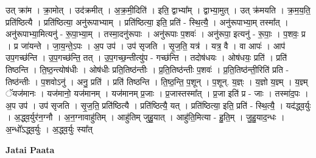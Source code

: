 \documentclass[17pt]{extarticle}
\begin{document}
उत् क्रा॑म । क्रा॒मोत् । उद॑क्रमीत् । अ॒क्र॒मी॒दिति॑ । इति॒ द्वाभ्या᳚म् । द्वाभ्या॒मुत् । उत् क्र॑मयति । क्र॒म॒य॒ति॒ प्रति॑ष्ठित्यै । प्रति॑ष्ठित्या॒ अनु॑रूपाभ्याम् । प्रति॑ष्ठित्या॒ इति॒ प्रति॑ - स्थि॒त्यै॒ । अनु॑रूपाभ्या॒म् तस्मा᳚त् । अनु॑रूपाभ्या॒मित्यनु॑ - रू॒पा॒भ्या॒म् । तस्मा॒दनु॑रूपाः । अनु॑रूपाः प॒शवः॑ । अनु॑रूपा॒ इत्यनु॑ - रू॒पाः॒ । प॒शवः॒ प्र । प्र जा॑यन्ते । जा॒य॒न्ते॒ऽपः । अ॒प उप॑ । उप॑ सृजति । सृ॒ज॒ति॒ यत्र॑ । यत्र॒ वै । वा आपः॑ । आप॑ उप॒गच्छ॑न्ति । उ॒प॒गच्छ॑न्ति॒ तत् । उ॒प॒गच्छ॒न्तीत्यु॑प - गच्छ॑न्ति । तदोष॑धयः । ओष॑धयः॒ प्रति॑ । प्रति॑ तिष्ठन्ति । ति॒ष्ठ॒न्त्योष॑धीः । ओष॑धीः प्रति॒तिष्ठ॑न्तीः । प्र॒ति॒तिष्ठ॑न्तीः प॒शवः॑ । प्र॒ति॒तिष्ठ॑न्ती॒रिति॑ प्रति - तिष्ठ॑न्तीः । प॒शवोऽनु॑ । अनु॒ प्रति॑ । प्रति॑ तिष्ठन्ति । ति॒ष्ठ॒न्ति॒ प॒शून् । प॒शून्. य॒ज्ञ्ः । य॒ज्ञो य॒ज्ञ्म् । य॒ज्ञ्म् ॅयज॑मानः । यज॑मानो॒ यज॑मानम् । यज॑मानम् प्र॒जाः । प्र॒जास्तस्मा᳚त् । प्र॒जा इति॑ प्र - जाः । तस्मा॑द॒पः । अ॒प उप॑ । उप॑ सृजति । सृ॒ज॒ति॒ प्रति॑ष्ठित्यै । प्रति॑ष्ठित्यै॒ यत् । प्रति॑ष्ठित्या॒ इति॒ प्रति॑ - स्थि॒त्यै॒ । यद॑द्ध्व॒र्युः । अ॒द्ध्व॒र्युर॑न॒ग्नौ । अ॒न॒ग्नावाहु॑तिम् । आहु॑तिम् जुहु॒यात् । आहु॑ति॒मित्या - हु॒ति॒म् । जु॒हु॒याद॒न्धः । अ॒न्धो᳚ऽद्ध्व॒र्युः । अ॒द्ध्व॒र्युः स्या᳚त् \newline

\textbf{Jatai Paata} \newline
\end{document}
